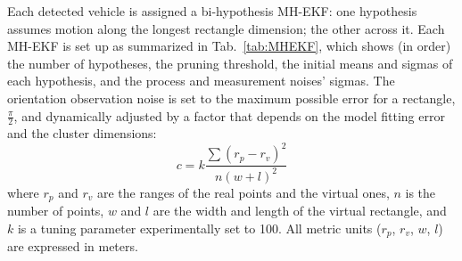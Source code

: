 \documentclass[letterpaper, 10 pt, conference]{ieeeconf}  %
\begin{document}
Each detected vehicle is assigned a bi-hypothesis MH-EKF: one hypothesis assumes motion along the longest rectangle dimension; the other across it. Each MH-EKF is set up as summarized in Tab.~\ref{tab:MHEKF}, which shows (in order) 
the number of hypotheses, 
the pruning threshold, 
the initial means and sigmas of each hypothesis, 
and the process and measurement noises' sigmas. The orientation observation noise is set to the maximum possible error for a rectangle, $\frac{\pi}{2}$, and dynamically adjusted by a factor that depends on the model fitting error and the cluster dimensions:  
\begin{equation}
c = k\frac{\sum{(r_p - r_v)^2}}{n(w+l)^2}
\end{equation}
where $r_p$ and $r_v$ are the ranges of the real points and the virtual ones, $n$ is the number of points, $w$ and $l$ are the width and length of the virtual rectangle, and $k$ is a tuning parameter experimentally set to 100. All metric units ($r_p$, $r_v$, $w$, $l$) are expressed in meters.
\end{document}
